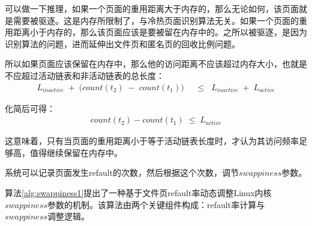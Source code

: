 可以做一下推理，如果一个页面的重用距离大于内存的，那么无论如何，该页面就是需要被驱逐。这是内存所限制了，与冷热页面识别算法无关。如果一个页面的重用距离小于内存的，那么该页面应该是要被留在内存中的。之所以被驱逐，是因为识别算法的问题，进而延伸出文件页和匿名页的回收比例问题。

所以如果页面应该保留在内存中，那么他的访问距离不应该超过内存大小，也就是不应超过活动链表和非活动链表的总长度：
\begin{align}
  \label{eq:active_condition_1}
  L_{inactive}
  \;+\;
  \bigl(count(t_2) \;-\; count(t_1)\bigr)
  &\;\;\le\;\;
  L_{inactive}
  \;+\;
  L_{active}
\end{align}

化简后可得：
\begin{align}
  \label{eq:active_condition}
  count(t_2) - {count}(t_1)
  \;\le\;
  L_{active}
\end{align}

这意味着，只有当页面的重用距离小于等于活动链表长度时，才认为其访问频率足够高，值得继续保留在内存中。

系统可以记录页面发生refault的次数，然后根据这个次数，调节\(swappiness\)参数。

算法\ref{alg:swappiness1}提出了一种基于文件页refault率动态调整Linux内核\(swappiness\)参数的机制。该算法由两个关键组件构成：refault率计算与\(swappiness\)调整逻辑。

